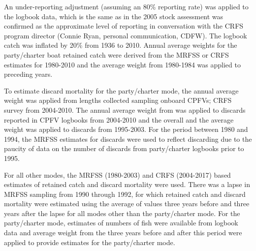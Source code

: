 \documentclass[12pt,]{article}
\begin{document}
An under-reporting adjustment (assuming an 80\% reporting rate) was
applied to the logbook data, which is the same as in the 2005 stock
assessment was confirmed as the approximate level of reporting in
conversation with the CRFS program director (Connie Ryan, personal
communication, CDFW). The logbook catch was inflated by 20\% from 1936
to 2010. Annual average weights for the party/charter boat retained
catch were derived from the MRFSS or CRFS estimates for 1980-2010 and
the average weight from 1980-1984 was applied to preceding years.

To estimate discard mortality for the party/charter mode, the annual
average weight was applied from lengths collected sampling onboard
CPFVs; CRFS survey from 2004-2010. The annual average weight from was
applied to discards reported in CPFV logbooks from 2004-2010 and the
overall and the average weight was applied to discards from 1995-2003.
For the period between 1980 and 1994, the MRFSS estimates for discards
were used to reflect discarding due to the paucity of data on the number
of discards from party/charter logbooks prior to 1995.

For all other modes, the MRFSS (1980-2003) and CRFS (2004-2017) based
estimates of retained catch and discard mortality were used. There was a
lapse in MRFSS sampling from 1990 through 1992, for which retained catch
and discard mortality were estimated using the average of values three
years before and three years after the lapse for all modes other than
the party/charter mode. For the party/charter mode, estimates of numbers
of fish were available from logbook data and average weight from the
three years before and after this period were applied to provide
estimates for the party/charter mode.
\end{document}
